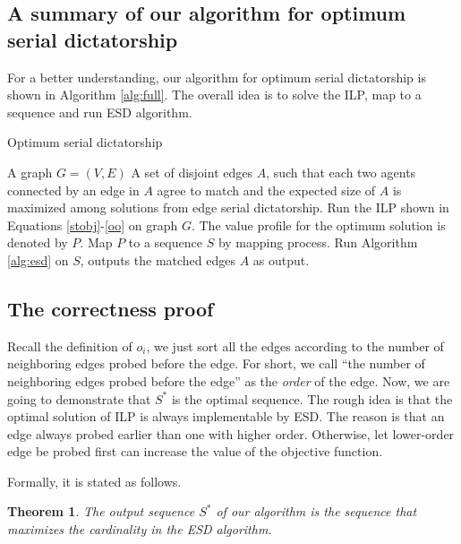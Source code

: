 \documentclass[letterpaper]{article}
\newtheorem{theorem}{Theorem}%
\begin{document}
\subsection{A summary of our algorithm for optimum serial dictatorship}
For a better understanding, our algorithm for optimum serial dictatorship is shown in Algorithm \ref{alg:full}.
The overall idea is to solve the ILP, map to a sequence and run ESD algorithm.
\begin{algorithm}
	\caption{Optimum serial dictatorship}
	\label{alg:full}
	\begin{algorithmic}[1]
		\Require
		A graph $G=(V,E)$
		\Ensure A set of disjoint edges $A$, such that each two agents connected by an edge in $A$ agree to match and the expected size of $A$ is maximized among solutions from edge serial dictatorship. 
		\State Run the ILP shown in Equations \ref{stobj}-\ref{oo} on graph $G$. The value profile for the optimum solution is denoted by $P$. 
		\State Map $P$ to a sequence $S$ by mapping process. 
		\State Run Algorithm \ref{alg:esd} on $S$, outputs the matched edges $A$ as output.
	\end{algorithmic}
\end{algorithm}

\subsection{The correctness proof}
Recall the definition of $o_i$, we just sort all the edges according to the number of neighboring edges probed before the edge.
For short, we call ``the number of neighboring edges probed before the edge'' as the \textit{order} of the edge.
Now, we are going to demonstrate that $S^*$ is the optimal sequence.
The rough idea is that the optimal solution of ILP is always implementable by ESD.
The reason is that an edge always probed earlier than one with higher order.
Otherwise, let lower-order edge be probed first can increase the value of the objective function.

Formally, it is stated as follows.

\begin{theorem}
	The output sequence $S^*$ of our algorithm is the sequence that maximizes the cardinality in the ESD algorithm.
\end{theorem}
\end{document}
